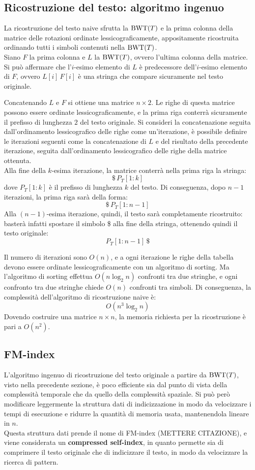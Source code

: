 \subsection{Ricostruzione del testo: algoritmo ingenuo}
La ricostruzione del testo naive sfrutta la $\textnormal{BWT}(T)$ e la prima colonna della matrice delle rotazioni ordinate lessicograficamente, appositamente ricostruita ordinando tutti i simboli contenuti nella $\textnormal{BWT}(T)$.\\
Siano $F$ la prima colonna e $L$ la $\textnormal{BWT}(T)$, ovvero l'ultima colonna della matrice. Si può affermare che l'$i$-esimo elemento di $L$ è predecessore dell'$i$-esimo elemento di $F$, ovvero $L[i] \, F[i]$ è una stringa che compare sicuramente nel testo originale.

Concatenando $L$ e $F$ si ottiene una matrice $n \times 2$. Le righe di questa matrice possono essere ordinate lessicograficamente, e la prima riga conterrà sicuramente il prefisso di lunghezza $2$ del testo originale.
Si consideri la concatenazione seguita dall'ordinamento lessicografico delle righe come un'iterazione, è possibile definire le iterazioni seguenti come la concatenazione di $L$ e del risultato della precedente iterazione, seguita dall'ordinamento lessicografico delle righe della matrice ottenuta.\\
Alla fine della $k$-esima iterazione, la matrice conterrà nella prima riga la stringa:
\[
    \$ \, P_T[1:k]
\]
dove $P_T[1:k]$ è il prefisso di lunghezza $k$ del testo. Di conseguenza, dopo $n-1$ iterazioni, la prima riga sarà della forma:
\[
    \$ \, P_T[1:n-1]
\]
Alla $(n-1)$-esima iterazione, quindi, il testo sarà completamente ricostruito: basterà infatti spostare il simbolo \$ alla fine della stringa, ottenendo quindi il testo originale:
\[
    P_T[1:n-1] \, \$
\]

Il numero di iterazioni sono $O(n)$, e a ogni iterazione le righe della tabella devono essere ordinate lessicograficamente con un algoritmo di sorting. Ma l'algoritmo di sorting effettua $O(n \log_2n)$ confronti tra due stringhe, e ogni confronto tra due stringhe chiede $O(n)$ confronti tra simboli. Di conseguenza, la complessità dell'algoritmo di ricostruzione naive è:
\[
    O(n^3\log_2n)
\]
Dovendo costruire una matrice $n \times n$, la memoria richiesta per la ricostruzione è pari a $O(n^2)$.

\subsection*{FM-index}
L'algoritmo ingenuo di ricostruzione del testo originale a partire da $\textnormal{BWT}(T)$, visto nella precedente sezione, è poco efficiente sia dal punto di vista della complessità temporale che da quello della complessità spaziale.
Si può però modificare leggermente la struttura dati di indicizzazione in modo da velocizzare i tempi di esecuzione e ridurre la quantità di memoria usata, mantenendola lineare in $n$.\\
Questa struttura dati prende il nome di FM-index (METTERE CITAZIONE), e viene considerata un \textbf{compressed self-index}, in quanto permette sia di comprimere il testo originale che di indicizzare il testo, in modo da velocizzare la ricerca di pattern.

